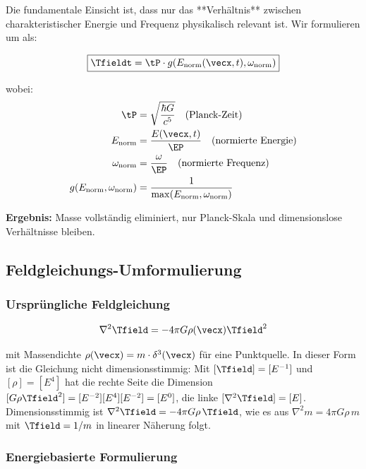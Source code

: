 	Die fundamentale Einsicht ist, dass nur das **Verhältnis** zwischen charakteristischer Energie und Frequenz physikalisch relevant ist. Wir formulieren um als:
	
	\begin{equation}
		\boxed{\Tfieldt = \tP \cdot g(E_{\text{norm}}(\vecx,t), \omega_{\text{norm}})}
		\label{eq:time_field_mass_free}
	\end{equation}
	
	wobei:
	\begin{align}
		\tP &= \sqrt{\frac{\hbar G}{c^5}} \quad \text{(Planck-Zeit)} \\
		E_{\text{norm}} &= \frac{E(\vecx,t)}{\EP} \quad \text{(normierte Energie)} \\
		\omega_{\text{norm}} &= \frac{\omega}{\EP} \quad \text{(normierte Frequenz)} \\
		g(E_{\text{norm}}, \omega_{\text{norm}}) &= \frac{1}{\max(E_{\text{norm}}, \omega_{\text{norm}})}
	\end{align}
	
	\textbf{Ergebnis:} Masse vollständig eliminiert, nur Planck-Skala und dimensionslose Verhältnisse bleiben.
	
	\subsection{Feldgleichungs-Umformulierung}
	\label{subsec:field_equation_elimination}
	
	\subsubsection{Ursprüngliche Feldgleichung}
	
	\begin{equation}
		\nabla^2 \Tfield = -4\pi G \rho(\vecx) \Tfield^2
		\label{eq:field_equation_original}
	\end{equation}
	
	mit Massendichte $\rho(\vecx) = m \cdot \delta^3(\vecx)$ für eine Punktquelle. In dieser Form ist die Gleichung nicht dimensionsstimmig: Mit $[\Tfield]=[E^{-1}]$ und $[\rho]=[E^4]$ hat die rechte Seite die Dimension $[G\rho\Tfield^2]=[E^{-2}][E^4][E^{-2}]=[E^0]$, die linke $[\nabla^2\Tfield]=[E]$. Dimensionsstimmig ist $\nabla^2\Tfield=-4\pi G\rho\,\Tfield$, wie es aus $\nabla^2 m=4\pi G\rho\, m$ mit $\Tfield=1/m$ in linearer Näherung folgt.
	
	\subsubsection{Energiebasierte Formulierung}
	
